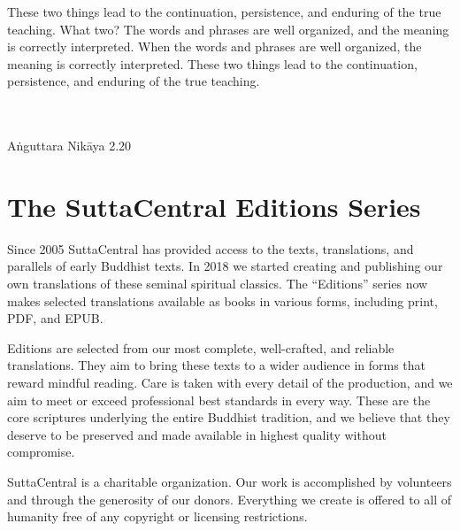 \documentclass[12pt,openany]{book}%
\newcommand{\blankpage}{
\newpage
\thispagestyle{empty}
\mbox{}
\newpage
}
\newcommand*{\epigraphTranslatedTitle}[1]{\vspace*{.5em}\footnotesize\textsc{#1}\\}%
\newcommand*{\epigraphRootTitle}[1]{\footnotesize\textit{#1}\\}%
\newcommand*{\epigraphReference}[1]{\footnotesize{#1}}%
\begin{document}
\newpage

\setlength{\parindent}{1.5em}%
\newpage

\vspace*{\fill}

\begin{center}
\epigraph{These two things lead to the continuation, persistence, and enduring of the true teaching. What two? The words and phrases are well organized, and the meaning is correctly interpreted. When the words and phrases are well organized, the meaning is correctly interpreted. These two things lead to the continuation, persistence, and enduring of the true teaching.}
{
\epigraphTranslatedTitle{}
\epigraphRootTitle{}
\epigraphReference{\textsanskrit{Aṅguttara} \textsanskrit{Nikāya} 2.20}
}
\end{center}

\vspace*{2in}

\vspace*{\fill}

\blankpage%

\setlength{\parindent}{1em}
%
\tableofcontents
\newpage
\pagestyle{fancy}
%
\chapter*{The SuttaCentral Editions Series}

Since 2005 SuttaCentral has provided access to the texts, translations, and parallels of early Buddhist texts. In 2018 we started creating and publishing our own translations of these seminal spiritual classics. The “Editions” series now makes selected translations available as books in various forms, including print, PDF, and EPUB.

Editions are selected from our most complete, well-crafted, and reliable translations. They aim to bring these texts to a wider audience in forms that reward mindful reading. Care is taken with every detail of the production, and we aim to meet or exceed professional best standards in every way. These are the core scriptures underlying the entire Buddhist tradition, and we believe that they deserve to be preserved and made available in highest quality without compromise.

SuttaCentral is a charitable organization. Our work is accomplished by volunteers and through the generosity of our donors. Everything we create is offered to all of humanity free of any copyright or licensing restrictions. 
\end{document}
